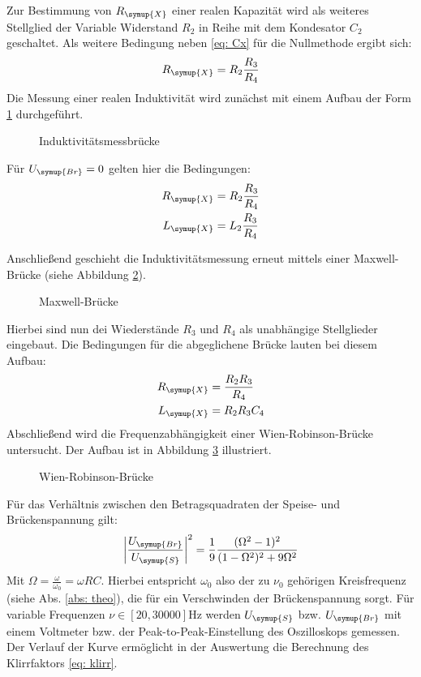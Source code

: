 Zur Bestimmung von $R_{\symup{X}}$ einer realen Kapazität wird als weiteres Stellglied der Variable Widerstand $R_2$ in Reihe mit dem Kondesator $C_2$
geschaltet. Als weitere Bedingung neben \eqref{eq: Cx} für die Nullmethode ergibt sich:
\begin{equation}
  R_{\symup{X}} = R_2\frac{R_3}{R_4}
  \label{eq: Rx}
\end{equation}
Die Messung einer realen Induktivität wird zunächst mit einem Aufbau der Form \ref{fig: induktivität} durchgeführt.
\FloatBarrier
\begin{figure}
  \centering
  \caption{Induktivitätsmessbrücke\cite{anleitung302}}
  \label{fig: induktivität}
  \end{figure}
Für $U_{\symup{Br}} = 0$ gelten hier die Bedingungen:
\begin{align}
  \begin{aligned}
    R_{\symup{X}} &= R_2\frac{R_3}{R_4} \\
    L_{\symup{X}} &= L_2\frac{R_3}{R_4}
  \end{aligned}
  \label{eq: Lx}
\end{align}

Anschließend geschieht die Induktivitätsmessung erneut mittels einer Maxwell-Brücke (siehe Abbildung \ref{fig: maxwell}).
\begin{figure}
  \centering
  \caption{Maxwell-Brücke\cite{anleitung302}}
  \label{fig: maxwell}
\end{figure}
Hierbei sind nun dei Wiederstände $R_3$ und $R_4$ als unabhängige Stellglieder eingebaut. Die Bedingungen für die abgeglichene Brücke lauten
bei diesem Aufbau:
\begin{align}
  \begin{aligned}
    R_{\symup{X}} &=\frac{R_2 R_3}{R_4} \\
    L_{\symup{X}} &= R_2 R_3 C_4
  \end{aligned}
  \label{eq: Lx_maxwell}
\end{align}
Abschließend wird die Frequenzabhängigkeit einer Wien-Robinson-Brücke untersucht. Der Aufbau ist in Abbildung
 \ref{fig: wienrob} illustriert.
\begin{figure}
  \centering
  \caption{Wien-Robinson-Brücke\cite{anleitung302}}
  \label{fig: wienrob}
\end{figure}
Für das Verhältnis zwischen den Betragsquadraten der Speise- und Brückenspannung gilt:
\begin{equation}
  \left| \frac{U_{\symup{Br}}}{U_{\symup{S}}}\right|^2 = \frac{1}{9} \frac{(\Omega^2 - 1)^2 }{(1 - \Omega ^2)^2 + 9 \Omega ^2}
\end{equation}
Mit $\Omega = \frac{\omega}{\omega_0} = \omega R C$. Hierbei entspricht $\omega_0$ also der zu $\nu_0$ gehörigen Kreisfrequenz (siehe Abs. \ref{abs: theo}), die
für ein Verschwinden der Brückenspannung sorgt. Für variable Frequenzen $\nu \in [20, \num{30000}]\si{\hertz}$ werden $U_{\symup{S}}$ bzw. $U_{\symup{Br}}$ mit einem
Voltmeter bzw. der Peak-to-Peak-Einstellung des Oszilloskops gemessen. Der Verlauf der Kurve ermöglicht in der Auswertung die Berechnung des Klirrfaktors \eqref{eq: klirr}.
